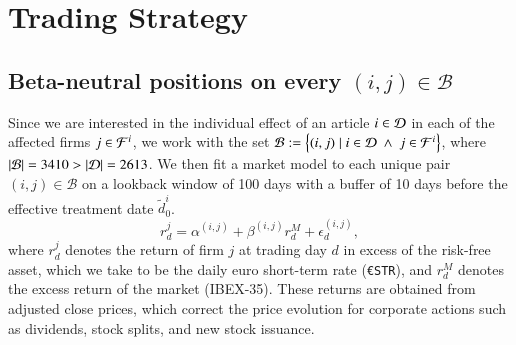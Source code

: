 \section{Trading Strategy}

\subsection{Beta-neutral positions on every $(i,j)\in\mathcal B$}
Since we are interested in the individual effect of an article $i\in\mathcal{D}$ in each of the affected firms $j\in\mathcal{F}^i$, we work with the set
$
\mathcal{B}:=\left\{(i,j) \mid i\in \mathcal{D} ~\wedge~j\in \mathcal{F}^i \right\}
$, where $\left|\mathcal{B}\right|=3410>\left|\mathcal{D}\right|=2613$. 
We then fit a market model to each unique pair $(i,j)\in \mathcal{B}$
on a lookback window of 100 days with a buffer of 10 days before the effective treatment date $\tilde d_0^i$. %
%
$$
r_{d}^{j} = \alpha^{(i,j)} + \beta^{(i,j)} r_{d}^M + \epsilon_{ d}^{(i,j)} 
,
$$
where 
$r_{d}^{j}$ denotes the return of firm $j$ at trading day $d$ in excess of the risk-free asset, which we take to be the daily euro short-term rate (\texttt{\euro STR}),
and 
$r_{d}^M$ denotes the excess return of the market (IBEX-35).  
These returns are obtained from adjusted close prices, which correct the price evolution for corporate actions such as dividends, stock splits, and new stock issuance.
